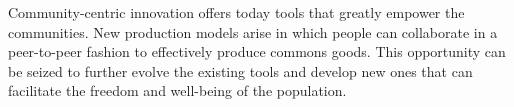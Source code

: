 \documentclass[journal]{IEEEtran}
\begin{document}
Community-centric innovation offers today tools that greatly empower the communities.
New production models arise in which people can collaborate in a peer-to-peer fashion to effectively produce commons goods.
This opportunity can be seized to further evolve the existing tools and develop new ones that can facilitate the freedom and well-being of the population. 


%
%



%
%
\end{document}

